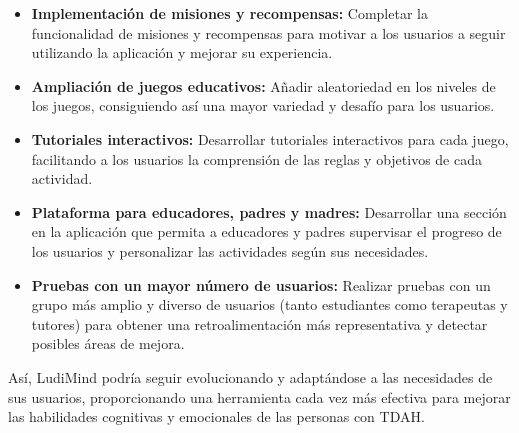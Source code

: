 \begin{itemize}
    \item \textbf{Implementación de misiones y recompensas:} Completar la funcionalidad de misiones y recompensas para motivar a los usuarios a seguir utilizando la aplicación y mejorar su experiencia.
    \item \textbf{Ampliación de juegos educativos:} Añadir aleatoriedad en los niveles de los juegos, consiguiendo así una mayor variedad y desafío para los usuarios.
    \item \textbf{Tutoriales interactivos:} Desarrollar tutoriales interactivos para cada juego, facilitando a los usuarios la comprensión de las reglas y objetivos de cada actividad.
    \item \textbf{Plataforma para educadores, padres y madres:} Desarrollar una sección en la aplicación que permita a educadores y padres supervisar el progreso de los usuarios y personalizar las actividades según sus necesidades.
    \item \textbf{Pruebas con un mayor número de usuarios:} Realizar pruebas con un grupo más amplio y diverso de usuarios (tanto estudiantes como terapeutas y tutores) para obtener una retroalimentación más representativa y detectar posibles áreas de mejora.
\end{itemize}

Así, LudiMind podría seguir evolucionando y adaptándose a las necesidades de sus usuarios, proporcionando una herramienta cada vez más efectiva para mejorar las habilidades cognitivas y emocionales de las personas con TDAH.